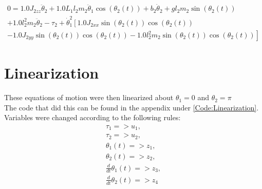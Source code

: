 \documentclass[letterpaper,10pt,oneside]{article}
\begin{document}


\begin{multline}
  0 = 1.0 J_{2zz} \ddot{\theta}_{2} + 1.0 L_{1} l_{2} m_{2} \ddot{\theta}_{1} \cos{\left(\theta_{2}{\left(t \right)} \right)} + b_{2} \dot{\theta}_{2} + g l_{2} m_{2} \sin{\left(\theta_{2}{\left(t \right)} \right)}
      \\
   + 1.0 l_{2}^{2} m_{2} \ddot{\theta}_{2} - \tau_{2} + \dot{\theta}_{1}^{2} \left[1.0 J_{2xx} \sin{\left(\theta_{2}{\left(t \right)} \right)} \cos{\left(\theta_{2}{\left(t \right)} \right)}
\right.
\\
\left.
   - 1.0 J_{2yy} \sin{\left(\theta_{2}{\left(t \right)} \right)} \cos{\left(\theta_{2}{\left(t \right)} \right)} - 1.0 l_{2}^{2} m_{2} \sin{\left(\theta_{2}{\left(t \right)} \right)} \cos{\left(\theta_{2}{\left(t \right)} \right)}\right]
\end{multline}

\section{Linearization}

These equations of motion were then linearized about $\theta_{1}=0$ and $\theta_{2}=\pi$ \\
The code that did this can be found in the appendix under \ref{Code:Linearization}. Variables were changed according to the following rules:
\begin{align}
 \tau_{1} => u_{1}, \\  \tau_{2} => u_{2}, \\  \theta_{1}{\left(t \right)} => z_{1}, \\  \theta_{2}{\left(t \right)} => z_{2}, \\  \frac{d}{d t} \theta_{1}{\left(t \right)} => z_{3}, \\  \frac{d}{d t} \theta_{2}{\left(t \right)} => z_{4} \\
\end{align}
\end{document}
